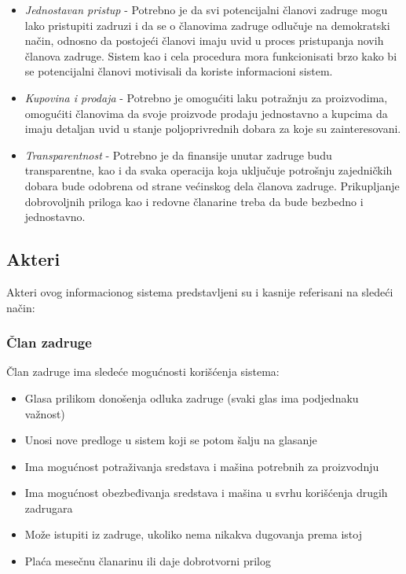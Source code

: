\documentclass[a4paper, oneside]{article}
\begin{document}
\begin{itemize}
  \item \textit{Jednostavan pristup} - Potrebno je da svi potencijalni članovi zadruge mogu lako pristupiti zadruzi i da se o članovima zadruge odlučuje na demokratski način, odnosno da postojeći članovi imaju uvid u proces pristupanja novih članova zadruge. Sistem kao i cela procedura mora funkcionisati brzo kako bi se potencijalni članovi motivisali da koriste informacioni sistem. 
  
  \item \textit{Kupovina i prodaja} - Potrebno je omogućiti laku potražnju za proizvodima, omogućiti članovima da svoje proizvode prodaju jednostavno a kupcima da imaju detaljan uvid u stanje poljoprivrednih dobara za koje su zainteresovani.
  
  \item \textit{Transparentnost} - Potrebno je da finansije unutar zadruge budu transparentne, kao i da svaka operacija koja uključuje potrošnju zajedničkih dobara bude odobrena od strane većinskog dela članova zadruge. Prikupljanje dobrovoljnih priloga kao i redovne članarine treba da bude bezbedno i jednostavno. 
\end{itemize}


\subsection{Akteri}
\indent  Akteri ovog informacionog sistema predstavljeni su i kasnije referisani na sledeći način:


\subsubsection{Član zadruge}
\indent Član zadruge ima sledeće mogućnosti korišćenja sistema:
\begin{itemize}
    \item Glasa prilikom donošenja odluka zadruge (svaki glas ima podjednaku važnost)
    \item Unosi nove predloge u sistem koji se potom šalju na glasanje
    \item Ima mogućnost potraživanja sredstava i mašina potrebnih za proizvodnju
    \item Ima mogućnost obezbeđivanja sredstava i mašina u svrhu korišćenja drugih zadrugara
    \item Može istupiti iz zadruge, ukoliko nema nikakva dugovanja prema istoj
    \item Plaća mesečnu članarinu ili daje dobrotvorni prilog
    
\end{itemize}
\end{document}
